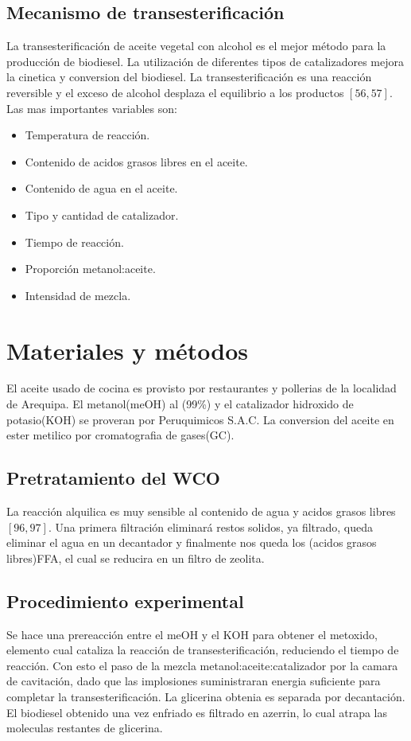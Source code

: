 \documentclass[a4paper,10pt]{article}
\begin{document}
\subsection{Mecanismo de transesterificación}
La transesterificación de aceite vegetal con alcohol es el mejor método para la producción de biodiesel. La utilización de diferentes tipos de catalizadores mejora la cinetica y conversion del biodiesel. La transesterificación es una reacción reversible y el exceso de alcohol desplaza el equilibrio a los productos $[56,57]$. \\
Las mas importantes variables son:
\begin{itemize}
 \item Temperatura de reacción.
 \item Contenido de acidos grasos libres en el aceite.
 \item Contenido de agua en el aceite.
 \item Tipo y cantidad de catalizador.
 \item Tiempo de reacción.
 \item Proporción metanol:aceite.
 \item Intensidad de mezcla.
\end{itemize}

\section{Materiales y métodos}
El aceite usado de cocina es provisto por restaurantes y pollerias de la localidad de Arequipa. El metanol(meOH) al (99\%) y el catalizador hidroxido de potasio(KOH) se proveran por Peruquimicos S.A.C. La conversion del aceite en ester metilico por cromatografia de gases(GC).
\subsection{Pretratamiento del WCO}
La reacción alquilica es muy sensible al contenido de agua y acidos grasos libres $[96,97]$. Una primera filtración eliminará restos solidos, ya filtrado, queda eliminar el agua en un decantador y finalmente nos queda los (acidos grasos libres)FFA, el cual se reducira en un filtro de zeolita.
\subsection{Procedimiento experimental}
Se hace una prereacción entre el meOH y el KOH para obtener el metoxido, elemento cual cataliza la reacción de transesterificación, reduciendo el tiempo de reacción.
Con esto el paso de la mezcla metanol:aceite:catalizador por la camara de cavitación, dado que las implosiones suministraran energia suficiente para completar la transesterificación.
La glicerina obtenia es separada por decantación. El biodiesel obtenido una vez enfriado es filtrado en azerrin, lo cual atrapa las moleculas restantes de glicerina. 
\end{document}
